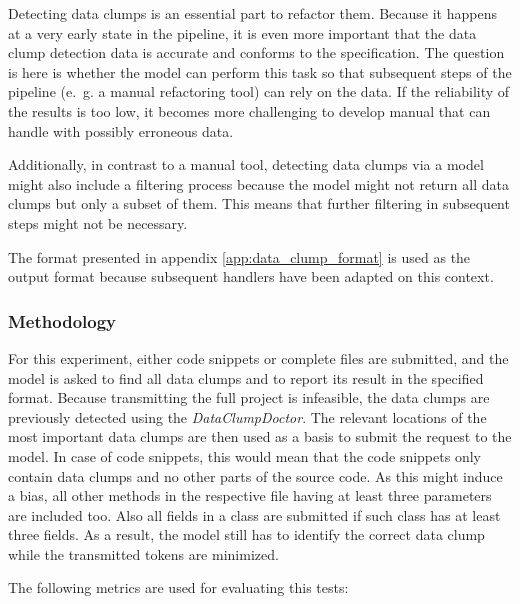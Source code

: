 Detecting data clumps is an essential part to refactor them. Because it happens at a very early state in the pipeline, it is even more important that the data clump detection data is accurate and conforms to the specification. The question is here is whether the model can perform this task so that subsequent steps of the pipeline (e.~g. a manual refactoring tool) can rely on the data. If the reliability of the results is too low, it becomes more challenging to develop manual that can handle with possibly erroneous data.

Additionally, in contrast to a manual tool, detecting data clumps via  a model might also include a filtering process because the model might not return all data clumps but only a subset of them. This means that further filtering in subsequent steps might not be necessary. 

The format presented in appendix \ref{app:data_clump_format} is used as the output format because subsequent handlers have been adapted on this context. 


\subsubsection{Methodology}

For this experiment, either code snippets or complete files are submitted, and the model is asked to find all data clumps and to report its result in the specified format.
Because transmitting the full project is infeasible, the data clumps are previously detected using the \textit{DataClumpDoctor}. The relevant locations of the most important data clumps are then used as a basis to submit the request to the model. In case of code snippets, this would mean that the code snippets only contain data clumps and no other parts of the source code. As this might induce a bias, all other methods in the respective file having at least three parameters are included too. Also all fields in a class are submitted if such class has at least three fields. As a result, the model still has to identify the correct data clump while  the transmitted tokens are minimized.  


The following metrics are used for evaluating this tests:

